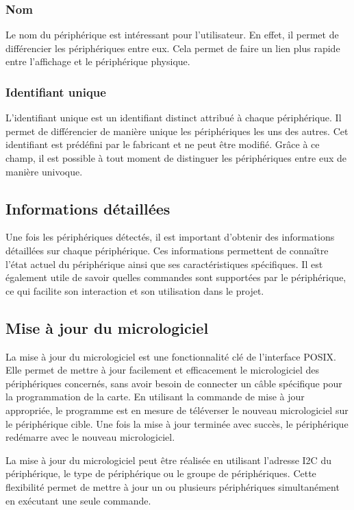 \subsubsection{Nom}

Le nom du périphérique est intéressant pour l'utilisateur. En effet, il permet de différencier les périphériques entre eux. Cela permet de faire un lien plus rapide entre l'affichage et le périphérique physique.

\subsubsection{Identifiant unique}

L'identifiant unique est un identifiant distinct attribué à chaque périphérique.
Il permet de différencier de manière unique les périphériques les uns des autres.
Cet identifiant est prédéfini par le fabricant et ne peut être modifié.
Grâce à ce champ, il est possible à tout moment de distinguer les périphériques entre eux de manière univoque.

\subsection{Informations détaillées}

Une fois les périphériques détectés, il est important d'obtenir des informations détaillées sur chaque périphérique.
Ces informations permettent de connaître l'état actuel du périphérique ainsi que ses caractéristiques spécifiques.
Il est également utile de savoir quelles commandes sont supportées par le périphérique, ce qui facilite son interaction et son utilisation dans le projet.

\subsection{Mise à jour du micrologiciel}

La mise à jour du micrologiciel est une fonctionnalité clé de l'interface POSIX.
Elle permet de mettre à jour facilement et efficacement le micrologiciel des périphériques concernés, sans avoir besoin de connecter un câble spécifique pour la programmation de la carte.
En utilisant la commande de mise à jour appropriée, le programme est en mesure de téléverser le nouveau micrologiciel sur le périphérique cible.
Une fois la mise à jour terminée avec succès, le périphérique redémarre avec le nouveau micrologiciel.

La mise à jour du micrologiciel peut être réalisée en utilisant l'adresse I2C du périphérique, le type de périphérique ou le groupe de périphériques.
Cette flexibilité permet de mettre à jour un ou plusieurs périphériques simultanément en exécutant une seule commande.


